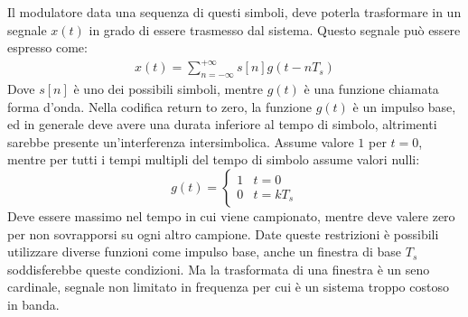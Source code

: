 \documentclass{article}
\numberwithin{equation}{subsection}
\begin{document}
Il modulatore data una sequenza di questi simboli, deve poterla trasformare in un segnale $x(t)$ in grado di essere trasmesso dal sistema. 
Questo segnale può essere espresso come:
\begin{gather}
    x(t)=\displaystyle\sum_{n=-\infty}^{+\infty}s[n]g(t-nT_s)
\end{gather}
Dove $s[n]$ è uno dei possibili simboli, mentre $g(t)$ è una funzione chiamata forma d'onda. 
Nella codifica return to zero, la funzione $g(t)$ è un impulso base, ed in generale deve avere una durata inferiore al tempo di simbolo, altrimenti sarebbe presente un'interferenza 
intersimbolica. Assume valore $1$ per $t=0$, mentre per tutti i tempi multipli del tempo di simbolo assume valori nulli:
\begin{equation}
    g(t)=\begin{cases}
        1&t=0\\
        0&t=kT_s
    \end{cases}
\end{equation}
Deve essere massimo nel tempo in cui viene campionato, mentre deve valere zero per non sovrapporsi su ogni altro campione. Date queste restrizioni è possibili utilizzare 
diverse funzioni come impulso base, anche un finestra di base $T_s$ soddisferebbe queste condizioni. Ma la trasformata di una finestra è un seno cardinale, 
segnale non limitato in frequenza per cui è un sistema troppo costoso in banda. 
\end{document}
